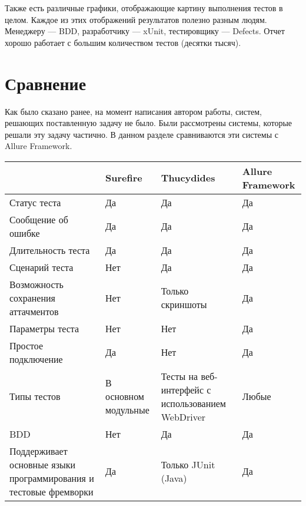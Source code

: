 Также есть различные графики, отображающие картину выполнения тестов в целом. Каждое из этих отображений результатов полезно разным людям. Менеджеру --- BDD, разработчику --- xUnit, тестировщику --- Defects. Отчет хорошо работает с большим количеством тестов (десятки тысяч).

\section{Сравнение}

Как было сказано ранее, на момент написания автором работы, систем, решающих поставленную задачу не было. Были рассмотрены системы, которые решали эту задачу частично. В данном разделе сравниваются эти системы с Allure Framework.


\begin{center}
\begin{tabular}{ | p{4cm} | p{4cm} | p{4cm} | p{4cm} | }
\hline
& Surefire & Thucydides & Allure Framework \\ \hline
Статус теста & Да & Да & Да \\ \hline
Сообщение об ошибке & Да & Да & Да \\ \hline
Длительность теста & Да & Да & Да \\ \hline
Сценарий теста & Нет & Да & Да \\ \hline
Возможность сохранения аттачментов & Нет & Только скриншоты & Да \\ \hline
Параметры теста & Нет & Нет & Да \\ \hline
Простое подключение & Да & Нет & Да \\ \hline
Типы тестов & В основном модульные & Тесты на веб-интерфейс с использованием WebDriver & Любые \\ \hline
BDD & Нет & Да & Да \\ \hline
Поддерживает основные языки программирования и тестовые фремворки & Да & Только JUnit (Java) & Да \\ \hline
\end{tabular}
\end{center}


